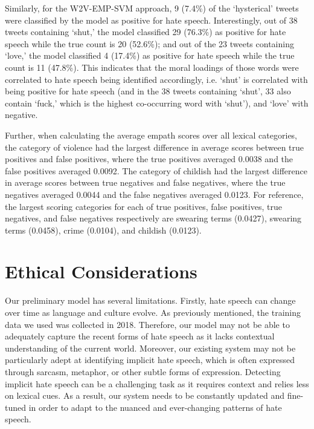 \documentclass[11pt,a4paper]{article}
\begin{document}
Similarly, for the W2V-EMP-SVM approach, 9 (7.4\%) of the ‘hysterical’ tweets were classified by the model as positive for hate speech. Interestingly, out of 38 tweets containing ‘shut,’ the model classified 29 (76.3\%) as positive for hate speech while the true count is 20 (52.6\%); and out of the 23 tweets containing ‘love,’ the model classified 4 (17.4\%) as positive for hate speech while the true count is 11 (47.8\%). This indicates that the moral loadings of those words were correlated to hate speech being identified accordingly, i.e. ‘shut’ is correlated with being positive for hate speech (and in the 38 tweets containing ‘shut’, 33 also contain ‘fuck,’ which is the highest co-occurring word with ‘shut’), and ‘love’ with negative.

Further, when calculating the average empath scores over all lexical categories, the category of violence had the largest difference in average scores between true positives and false positives, where the true positives averaged 0.0038 and the false positives averaged 0.0092. The category of childish had the largest difference in average scores between true negatives and false negatives, where the true negatives averaged 0.0044 and the false negatives averaged 0.0123. For reference, the largest scoring categories for each of true positives, false positives, true negatives, and false negatives respectively are swearing terms (0.0427), swearing terms (0.0458), crime (0.0104), and childish (0.0123).


\section{Ethical Considerations}
      Our preliminary model has several limitations. Firstly, hate speech can change over time as language and culture evolve. As previously mentioned, the training data we used was collected in 2018. Therefore, our model may not be able to adequately capture the recent forms of hate speech as it lacks contextual understanding of the current world. Moreover, our existing system may not be particularly adept at identifying implicit hate speech, which is often expressed through sarcasm, metaphor, or other subtle forms of expression. Detecting implicit hate speech can be a challenging task as it requires context and relies less on lexical cues. As a result, our system needs to be constantly updated and fine-tuned in order to adapt to the nuanced and ever-changing patterns of hate speech.
      
\end{document}
